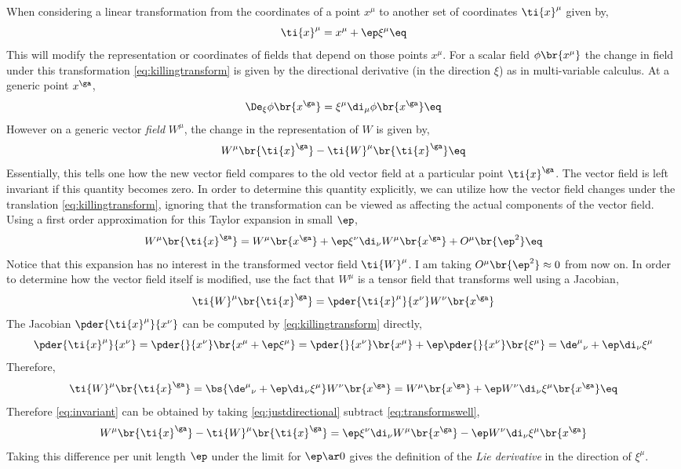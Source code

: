 \documentclass{article}
\begin{document}
When considering a linear transformation from the coordinates of a point $x^\mu$ to another set of coordinates $\ti{x}^\mu$ given by,
\[ \ti{x}^\mu = x^\mu + \ep \xi^\mu \eq \label{eq:killingtransform} \]
This will modify the representation or coordinates of fields that depend on those points $x^\mu$. For a scalar field $\phi \br{x^\mu}$ the change in field under this transformation \eqref{eq:killingtransform} is given by the directional derivative (in the direction $\xi$) as in multi-variable calculus. At a generic point $x^\ga$,
\[ \De_{\xi}\phi\br{x^\ga} = \xi^\mu \di_\mu \phi\br{x^\ga} \eq \label{eq:scalardirectional} \]
However on a generic vector \textit{field} $W^\mu$, the change in the representation of $W$ is given by,
\[ W^\mu \br{\ti{x}^\ga} - \ti{W}^\mu \br{\ti{x}^\ga} \eq \label{eq:invariant} \]
Essentially, this tells one how the new vector field compares to the old vector field at a particular point $\ti{x}^\ga$. The vector field is left invariant if this quantity becomes zero. In order to determine this quantity explicitly, we can utilize how the vector field changes under the translation \eqref{eq:killingtransform}, ignoring that the transformation can be viewed as affecting the actual components of the vector field. Using a first order approximation for this Taylor expansion in small $\ep$,
\[ W^\mu \br{\ti{x}^\ga} = W^\mu \br{x^\ga} + \ep \xi^\nu \di_\nu W^\mu \br{x^\ga} + O^\mu\br{\ep^2}  \eq \label{eq:justdirectional} \]
Notice that this expansion has no interest in the transformed vector field $\ti{W}^\mu$. I am taking $O^\mu\br{\ep^2} \approx 0$ from now on. In order to determine how the vector field itself is modified, use the fact that $W^\mu$ is a tensor field that transforms well using a Jacobian,
\[ \ti{W}^\mu \br{\ti{x}^\ga} = \pder{\ti{x}^\mu}{x^\nu} W^\nu \br{x^\ga} \]
The Jacobian $\pder{\ti{x}^\mu}{x^\nu}$ can be computed by \eqref{eq:killingtransform} directly,
\[ \pder{\ti{x}^\mu}{x^\nu} = \pder{}{x^\nu}\br{x^\mu + \ep \xi^\mu} = \pder{}{x^\nu}\br{x^\mu} + \ep \pder{}{x^\nu}\br{\xi^\mu} = {\de^\mu}_\nu + \ep \di_\nu \xi^\mu \]
Therefore,
\[ \ti{W}^\mu \br{\ti{x}^\ga} = \bs{{\de^\mu}_\nu + \ep \di_\nu \xi^\mu}W^\nu \br{x^\ga} = W^\mu \br{x^\ga} + \ep W^\nu \di_\nu \xi^\mu  \br{x^\ga} \eq \label{eq:transformswell}\]
Therefore \eqref{eq:invariant} can be obtained by taking \eqref{eq:justdirectional} subtract \eqref{eq:transformswell},
\[ W^\mu \br{\ti{x}^\ga} - \ti{W}^\mu \br{\ti{x}^\ga} = \ep \xi^\nu \di_\nu  W^\mu \br{x^\ga} -\ep W^\nu \di_\nu \xi^\mu \br{x^\ga} \]
Taking this difference per unit length $\ep$ under the limit for $\ep \ar 0$ gives the definition of the \textit{Lie derivative} in the direction of $\xi^\mu$.
\end{document}

